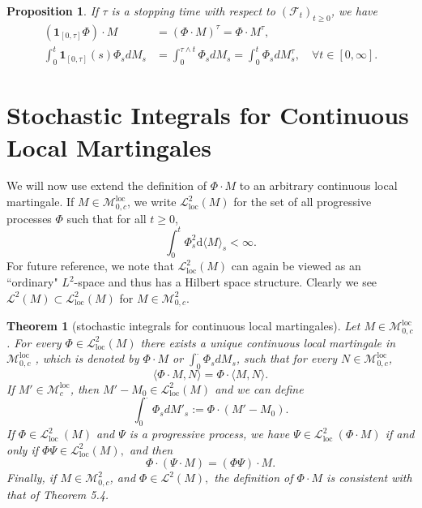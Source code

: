 \documentclass{report}
\newtheorem{proposition}{Proposition}[section]
\newtheorem{theorem}{Theorem}[section]
\theoremstyle{nonumberplain}
\begin{document}
\begin{proposition}
If $\tau$ is a stopping time with respect to $(\mathcal{F}_t)_{t\ge0}$, we have
\begin{align*}
\left(\mathbf{1}_{[0, \tau]} \Phi\right) \cdot M&=(\Phi \cdot M)^{\tau}=\Phi \cdot M^{\tau},\\
\int_{0}^{t}\mathbf{1}_{[0, \tau]}(s)\Phi_sdM_s&=\int_{0}^{\tau\wedge t}\Phi_sdM_s=\int_{0}^{ t}\Phi_sdM_s^{\tau},\quad\forall t\in[0,\infty].
\end{align*}
\end{proposition}

\section{Stochastic Integrals for Continuous Local Martingales}

We will now use extend the definition of $\Phi \cdot M$ to an arbitrary continuous local martingale. If $M\in\mathscr{M}^{\mathrm{loc}}_{0,c}$, we write $\mathscr{L}_{\mathrm{loc}}^{2}(M)$ for the set of all progressive processes $\Phi$ such that for all $t\ge0$,
\[
\int_{0}^{t} \Phi_{s}^{2} \mathrm{d}\langle M\rangle_{s}<\infty.
\]
For future reference, we note that $\mathscr{L}_{\mathrm{loc}}^{2}(M)$ can again be viewed as an ``ordinary" $L^{2}$-space and thus has a Hilbert space structure. Clearly we see $\mathscr{L}^{2}(M)\subset\mathscr{L}_{\mathrm{loc}}^{2}(M)$ for $M\in\mathscr{M}^{2}_{0,c}$.


\begin{theorem}[stochastic integrals for continuous local martingales]
	Let $M\in\mathscr{M}^{\mathrm{loc}}_{0,c}$. For every $\Phi \in \mathscr{L}_{\mathrm{loc}}^{2}(M)$ there exists a unique continuous local martingale in $\mathscr{M}^{\mathrm{loc}}_{0,c}$ , which is denoted by $\Phi \cdot M$ or $\int_{0}^{\cdot}\Phi_sdM_s$, such that for every $N\in\mathscr{M}^{\mathrm{loc}}_{0,c}$,
	\[
	\langle \Phi \cdot M, N\rangle= \Phi \cdot\langle M, N\rangle.
	\]
	If $M'\in\mathscr{M}^{\mathrm{loc}}_{c}$, then $M'-M_0\in \mathscr{L}_{\mathrm{loc}}^{2}(M)$ and we can define
	\[
	\int_{0}^{\cdot}\Phi_sdM'_s:=\Phi\cdot(M'-M_0).
	\]
	If $\Phi \in \mathscr{L}_{\text {loc }}^{2}(M)$ and $\Psi$ is a progressive process, we have $\Psi \in \mathscr{L}_{\text {loc }}^{2}(\Phi \cdot M)$ if and only if $\Phi \Psi \in \mathscr{L}_{\mathrm{loc}}^{2}(M),$ and then
	\[
	\Phi \cdot(\Psi \cdot M)=(\Phi \Psi) \cdot M.
	\]
	Finally, if $M\in\mathscr{M}^{2}_{0,c}$, and $\Phi \in\mathscr{L}^{2}(M),$ the definition of $\Phi \cdot M$ is consistent with that of Theorem 5.4.
\end{theorem}
\end{document}
